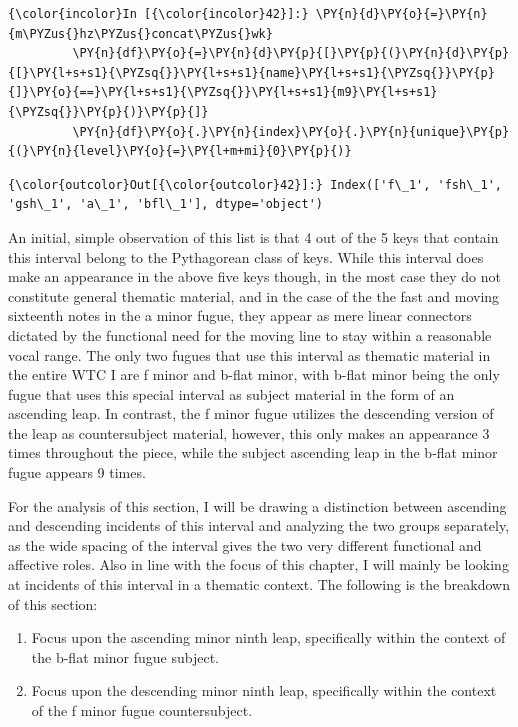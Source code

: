    \begin{Verbatim}[commandchars=\\\{\}]
{\color{incolor}In [{\color{incolor}42}]:} \PY{n}{d}\PY{o}{=}\PY{n}{m\PYZus{}hz\PYZus{}concat\PYZus{}wk}
         \PY{n}{df}\PY{o}{=}\PY{n}{d}\PY{p}{[}\PY{p}{(}\PY{n}{d}\PY{p}{[}\PY{l+s+s1}{\PYZsq{}}\PY{l+s+s1}{name}\PY{l+s+s1}{\PYZsq{}}\PY{p}{]}\PY{o}{==}\PY{l+s+s1}{\PYZsq{}}\PY{l+s+s1}{m9}\PY{l+s+s1}{\PYZsq{}}\PY{p}{)}\PY{p}{]}
         \PY{n}{df}\PY{o}{.}\PY{n}{index}\PY{o}{.}\PY{n}{unique}\PY{p}{(}\PY{n}{level}\PY{o}{=}\PY{l+m+mi}{0}\PY{p}{)}
\end{Verbatim}
\begin{Verbatim}[commandchars=\\\{\}]
{\color{outcolor}Out[{\color{outcolor}42}]:} Index(['f\_1', 'fsh\_1', 'gsh\_1', 'a\_1', 'bfl\_1'], dtype='object')
\end{Verbatim}
    An initial, simple observation of this list is that 4 out of the 5 keys
that contain this interval belong to the Pythagorean class of keys.
While this interval does make an appearance in the above five keys
though, in the most case they do not constitute general thematic
material, and in the case of the the fast and moving sixteenth notes in
the a minor fugue, they appear as mere linear connectors dictated by the
functional need for the moving line to stay within a reasonable vocal
range. The only two fugues that use this interval as thematic material
in the entire WTC I are f minor and b-flat minor, with b-flat minor
being the only fugue that uses this special interval as subject material
in the form of an ascending leap. In contrast, the f minor fugue
utilizes the descending version of the leap as countersubject material,
however, this only makes an appearance 3 times throughout the piece,
while the subject ascending leap in the b-flat minor fugue appears 9
times.

For the analysis of this section, I will be drawing a distinction
between ascending and descending incidents of this interval and
analyzing the two groups separately, as the wide spacing of the interval
gives the two very different functional and affective roles. Also in
line with the focus of this chapter, I will mainly be looking at
incidents of this interval in a thematic context. The following is the
breakdown of this section:

\begin{enumerate}
\def\labelenumi{\arabic{enumi}.}
\tightlist
\item
  Focus upon the ascending minor ninth leap, specifically within the
  context of the b-flat minor fugue subject.
\item
  Focus upon the descending minor ninth leap, specifically within the
  context of the f minor fugue countersubject.
\end{enumerate}

